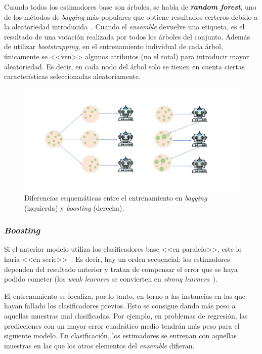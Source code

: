 Cuando todos los estimadores base son árboles, se habla de \textbf{\textit{random forest}}, uno de los métodos de \textit{bagging} más populares que obtiene resultados certeros debido a la aleatoriedad introducida~\cite{originalCoForest2007}. Cuando el \textit{ensemble} devuelve una etiqueta, es el resultado de una votación realizada por todos los árboles del conjunto. Además de utilizar \textit{bootstrapping}, en el entrenamiento individual de cada árbol, únicamente se <<ven>> algunos atributos (no el total) para introducir mayor aleatoriedad. Es decir, en cada nodo del árbol solo se tienen en cuenta ciertas características seleccionadas aleatoriamente.

\begin{figure}[h]
	\caption[\textit{Ensembres}: entrenamiento en \textit{bagging} y \textit{boosting}]{Diferencias esquemáticas entre el entrenamiento en \textit{bagging} (izquierda) y \textit{boosting} (derecha).}
	\label{img:bagging}
	\centering
	\includegraphics[width=\textwidth]{../img/memoria/3_bagging_boosting.pdf}
\end{figure}
	
\subsubsection{\textit{Boosting}}

Si el anterior modelo utiliza los clasificadores base <<en paralelo>>, este lo haría <<en serie>>~\cite{engelen2018thesis}. Es decir, hay un orden secuencial: los estimadores dependen del resultado anterior y tratan de compensar el error que se haya podido cometer (los \textit{weak learners} se convierten en \textit{strong learners}~\cite{ensembles2006robi}).

El entrenamiento se focaliza, por lo tanto, en torno a las instancias en las que hayan fallado los clasificadores previos. Esto se consigue dando más peso a aquellas muestras mal clasificadas. Por ejemplo, en problemas de regresión, las predicciones con un mayor error cuadrático medio tendrán más peso para el siguiente modelo. En clasificación, los estimadores se entrenan con aquellas muestras en las que los otros elementos del \textit{ensemble} difieran.


